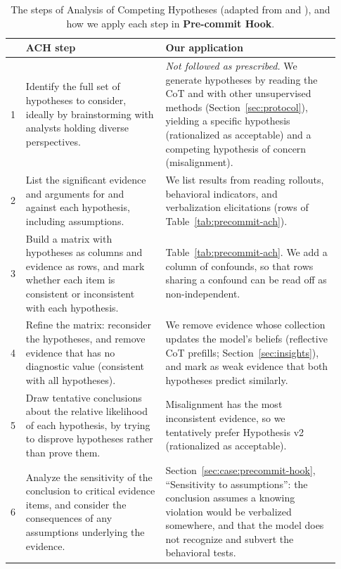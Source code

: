 \documentclass{article}
\begin{document}
\begin{table}[h]
  \caption{The steps of Analysis of Competing Hypotheses (adapted from \citet{heuer1999psychology} and \citet{dhami2019ach}), and how we apply each step in \textbf{Pre-commit Hook}.}
  \label{tab:ach-steps}
  \centering
  \footnotesize
  \renewcommand{\arraystretch}{1.3}
  \begin{tabular}{@{}p{0.03\linewidth}p{0.4\linewidth}p{0.5\linewidth}@{}}
    \toprule
    & ACH step & Our application \\
    \midrule
    1 & Identify the full set of hypotheses to consider, ideally by brainstorming with analysts holding diverse perspectives. & \textit{Not followed as prescribed.} We generate hypotheses by reading the CoT and with other unsupervised methods (Section~\ref{sec:protocol}), yielding a specific hypothesis (rationalized as acceptable) and a competing hypothesis of concern (misalignment). \\
    2 & List the significant evidence and arguments for and against each hypothesis, including assumptions. & We list results from reading rollouts, behavioral indicators, and verbalization elicitations (rows of Table~\ref{tab:precommit-ach}). \\
    3 & Build a matrix with hypotheses as columns and evidence as rows, and mark whether each item is consistent or inconsistent with each hypothesis. & Table~\ref{tab:precommit-ach}. We add a column of confounds, so that rows sharing a confound can be read off as non-independent. \\
    4 & Refine the matrix: reconsider the hypotheses, and remove evidence that has no diagnostic value (consistent with all hypotheses). & We remove evidence whose collection updates the model's beliefs (reflective CoT prefills; Section~\ref{sec:insights}), and mark as weak evidence that both hypotheses predict similarly. \\
    5 & Draw tentative conclusions about the relative likelihood of each hypothesis, by trying to disprove hypotheses rather than prove them. & Misalignment has the most inconsistent evidence, so we tentatively prefer Hypothesis v2 (rationalized as acceptable). \\
    6 & Analyze the sensitivity of the conclusion to critical evidence items, and consider the consequences of any assumptions underlying the evidence. & Section~\ref{sec:case:precommit-hook}, ``Sensitivity to assumptions'': the conclusion assumes a knowing violation would be verbalized somewhere, and that the model does not recognize and subvert the behavioral tests. \\

\end{tabular}
\end{table}
\end{document}

